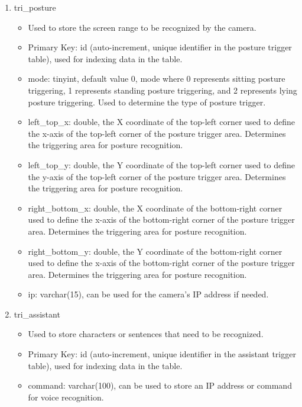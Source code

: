\begin{enumerate}
\begin{enumerate}
                        \item tri\_posture
                              \begin{itemize}
                                  \item Used to store the screen range to be recognized by the camera.
                                  \item Primary Key: id (auto-increment, unique identifier in the posture trigger table), used for indexing data in the table.
                                  \item mode: tinyint, default value 0, mode where 0 represents sitting posture triggering, 1 represents standing posture triggering, and 2 represents lying posture triggering. Used to determine the type of posture trigger.
                                  \item left\_top\_x: double, the X coordinate of the top-left corner used to define the x-axis of the top-left corner of the posture trigger area. Determines the triggering area for posture recognition.
                                  \item left\_top\_y: double, the Y coordinate of the top-left corner used to define the y-axis of the top-left corner of the posture trigger area. Determines the triggering area for posture recognition.
                                  \item right\_bottom\_x: double, the X coordinate of the bottom-right corner used to define the x-axis of the bottom-right corner of the posture trigger area. Determines the triggering area for posture recognition.
                                  \item right\_bottom\_y: double, the Y coordinate of the bottom-right corner used to define the x-axis of the bottom-right corner of the posture trigger area. Determines the triggering area for posture recognition.
                                  \item ip: varchar(15), can be used for the camera's IP address if needed.\\
                              \end{itemize}

                        \item tri\_assistant
                              \begin{itemize}
                                  \item Used to store characters or sentences that need to be recognized.
                                  \item Primary Key: id (auto-increment, unique identifier in the assistant trigger table), used for indexing data in the table.
                                  \item command: varchar(100), can be used to store an IP address or command for voice recognition.\\
                              \end{itemize}


\end{enumerate}
\end{enumerate}
